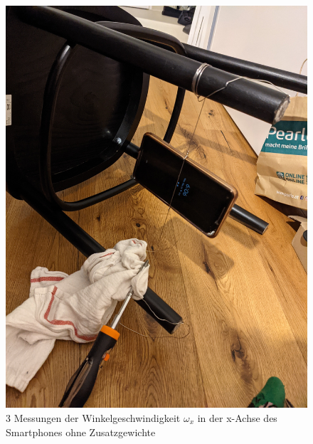 \documentclass[11pt,ngerman]{scrartcl}
\begin{document}
\begin{figure}[H]
\begin{minipage}[htbp]{\linewidth}
\begin{minipage}[htbp]{.32\linewidth}
            \includegraphics[angle=-90,origin=c,width=\linewidth]{pics/Aufbau (3).jpg}
        \end{minipage}
        \caption[Aufbau des Experiments]{3 Messungen der Winkelgeschwindigkeit $\omega_{x}$ in der x-Achse des Smartphones ohne Zusatzgewichte}
        \label{fig:Aufbau}
    \end{minipage}
 \end{figure}
\end{document}

